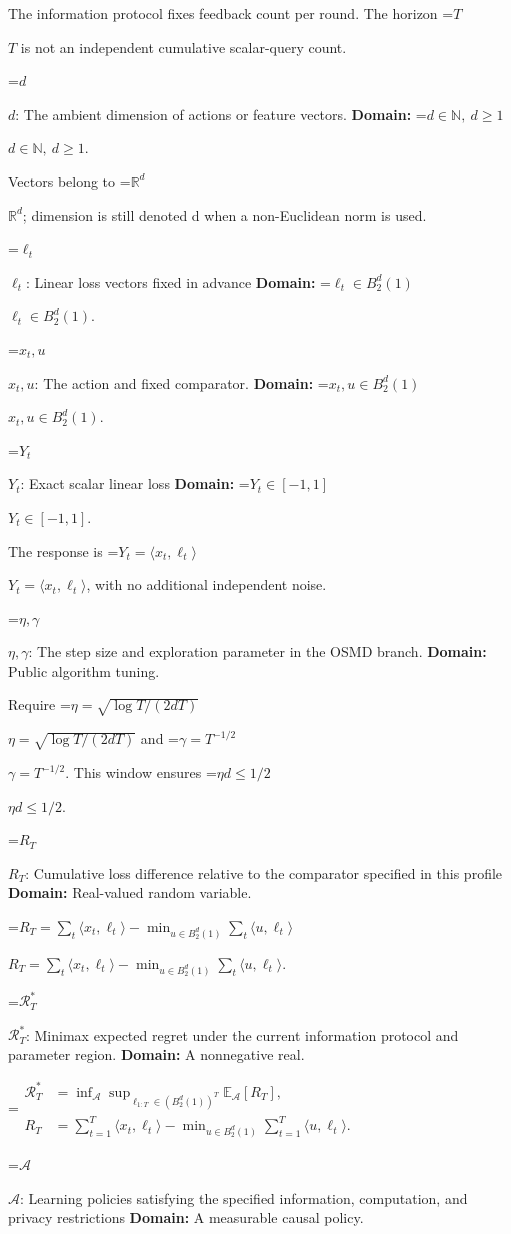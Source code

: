 \documentclass[10pt,a4paper]{article}
\newcommand{\AtlasMath}[1]{\par\begingroup\centering\setbox0=\hbox{$\displaystyle #1$}\ifdim\wd0>1.4\linewidth\typeout{ATLAS WIDE FORMULA: \the\wd0}\fi\ifdim\wd0>\linewidth\resizebox{\linewidth}{!}{\box0}\else\box0\fi\par\endgroup}
\newcommand{\AtlasInlineMath}[1]{\begingroup\setbox0=\hbox{$#1$}\ifdim\wd0>.4\linewidth\endgroup\AtlasMath{#1}\else\endgroup$#1$\fi}
\begin{document}
The information protocol fixes feedback count per round. The horizon \AtlasInlineMath{T} is not an independent cumulative scalar-query count.

\AtlasInlineMath{d}: The ambient dimension of actions or feature vectors. \textbf{Domain:} \AtlasInlineMath{d\in\mathbb N,\ d\ge1}.

Vectors belong to \AtlasInlineMath{\mathbb R^d}; dimension is still denoted d when a non-Euclidean norm is used.

\AtlasInlineMath{\ell_t}: Linear loss vectors fixed in advance \textbf{Domain:} \AtlasInlineMath{\ell_t\in B_2^d(1)}.

\AtlasInlineMath{x_t,u}: The action and fixed comparator. \textbf{Domain:} \AtlasInlineMath{x_t,u\in B_2^d(1)}.

\AtlasInlineMath{Y_t}: Exact scalar linear loss \textbf{Domain:} \AtlasInlineMath{Y_t\in[-1,1]}.

The response is \AtlasInlineMath{Y_t=\langle x_t,\ell_t\rangle}, with no additional independent noise.

\AtlasInlineMath{\eta,\gamma}: The step size and exploration parameter in the OSMD branch. \textbf{Domain:} Public algorithm tuning.

Require \AtlasInlineMath{\eta=\sqrt{\log T/(2dT)}} and \AtlasInlineMath{\gamma=T^{-1/2}}. This window ensures \AtlasInlineMath{\eta d\le1/2}.

\AtlasInlineMath{R_T}: Cumulative loss difference relative to the comparator specified in this profile \textbf{Domain:} Real-valued random variable.

\AtlasInlineMath{R_T=\sum_t\langle x_t,\ell_t\rangle-\min_{u\in B_2^d(1)}\sum_t\langle u,\ell_t\rangle}.

\AtlasInlineMath{\mathcal R_T^*}: Minimax expected regret under the current information protocol and parameter region. \textbf{Domain:} A nonnegative real.


\AtlasMath{\begin{aligned}\mathcal R_T^*&=\inf_{\mathcal A}\sup_{\ell_{1:T}\in(B_2^d(1))^T}\mathbb E_{\mathcal A}[R_T],\\ R_T&=\sum_{t=1}^T\langle x_t,\ell_t\rangle-\min_{u\in B_2^d(1)}\sum_{t=1}^T\langle u,\ell_t\rangle.\end{aligned}}


\AtlasInlineMath{\mathcal A}: Learning policies satisfying the specified information, computation, and privacy restrictions \textbf{Domain:} A measurable causal policy.
\end{document}
